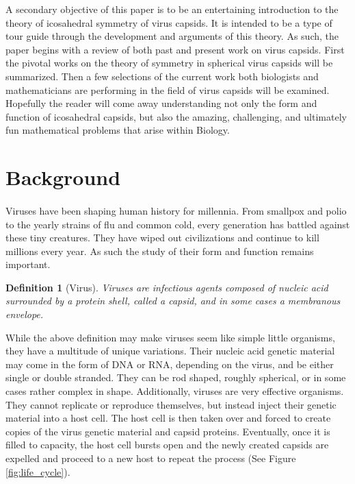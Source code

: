 \documentclass[12pt,letter]{article}
\newtheorem*{definition*}{Definition}
\begin{document}
A secondary objective of this paper is to be an entertaining introduction to the theory of icosahedral symmetry of virus capsids. It is intended to be a type of tour guide through the development and arguments of this theory. As such, the paper begins with a review of both past and present work on virus capsids. First the pivotal works on the theory of symmetry in spherical virus capsids will be summarized. Then a few selections of the current work both biologists and mathematicians are performing in the field of virus capsids will be examined. Hopefully the reader will come away understanding not only the form and function of icosahedral capsids, but also the amazing, challenging, and ultimately fun mathematical problems that arise within Biology. 

\section{Background} %

\paragraph{}
Viruses have been shaping human history for millennia. From smallpox and polio to the yearly strains of flu and common cold, every generation has battled against these tiny creatures. They have wiped out civilizations and continue to kill millions every year. As such the study of their form and function remains important.

\begin{definition*}[Virus]
Viruses are infectious agents composed of nucleic acid surrounded by a protein shell, called a capsid, and in some cases a membranous envelope. 
\end{definition*}
While the above definition may make viruses seem like simple little organisms, they have a multitude of unique variations. Their nucleic acid genetic material may come in the form of DNA or RNA, depending on the virus, and be either single or double stranded. They can be rod shaped, roughly spherical, or in some cases rather complex in shape. Additionally, viruses are very effective organisms. They cannot replicate or reproduce themselves, but instead inject their genetic material into a host cell. The host cell is then taken over and forced to create copies of the virus genetic material and capsid proteins. Eventually, once it is filled to capacity, the host cell bursts open and the newly created capsids are expelled and proceed to a new host to repeat the process (See Figure \ref{fig:life_cycle}). \cite{Campbell:2002}
\end{document}
